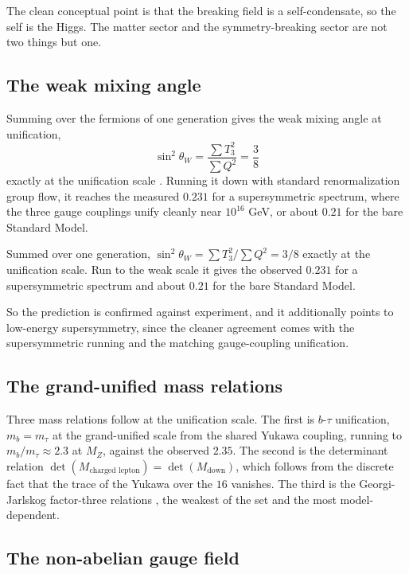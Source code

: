 The clean conceptual point is that the breaking field is a self-condensate, so the self is the Higgs. The matter
sector and the symmetry-breaking sector are not two things but one.

\subsection{The weak mixing angle}

Summing over the fermions of one generation gives the weak mixing angle at unification,
\[
\sin^2\theta_W = \frac{\sum T_3^2}{\sum Q^2} = \frac{3}{8}
\]
exactly at the unification scale \cite{georgiquinnweinberg1974}. Running it down with standard renormalization
group flow, it reaches the measured $0.231$ for a supersymmetric spectrum, where the three gauge couplings unify
cleanly near $10^{16}$ GeV, or about $0.21$ for the bare Standard Model.

\begin{theorem}[$\sin^2\theta_W = 3/8$ at unification]
Summed over one generation, $\sin^2\theta_W = \sum T_3^2 / \sum Q^2 = 3/8$ exactly at the unification scale. Run
to the weak scale it gives the observed $0.231$ for a supersymmetric spectrum and about $0.21$ for the bare
Standard Model.
\end{theorem}

So the prediction is confirmed against experiment, and it additionally points to low-energy supersymmetry, since
the cleaner agreement comes with the supersymmetric running and the matching gauge-coupling unification.

\subsection{The grand-unified mass relations}

Three mass relations follow at the unification scale. The first is $b$-$\tau$ unification, $m_b = m_\tau$ at the
grand-unified scale from the shared Yukawa coupling, running to $m_b / m_\tau \approx 2.3$ at $M_Z$, against the
observed $2.35$. The second is the determinant relation
$\det(M_{\text{charged lepton}}) = \det(M_{\text{down}})$, which follows from the discrete fact that the trace of
the Yukawa over the $16$ vanishes. The third is the Georgi-Jarlskog factor-three relations
\cite{georgijarlskog1979}, the weakest of the set and the most model-dependent.

\subsection{The non-abelian gauge field}


